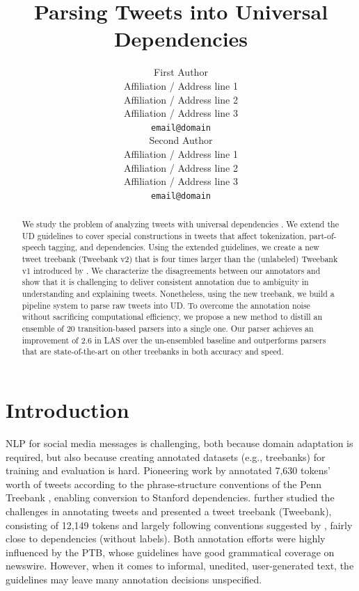 \documentclass[11pt,a4paper]{article}
\title{Parsing Tweets into Universal Dependencies}
\author{First Author \\
  Affiliation / Address line 1 \\
  Affiliation / Address line 2 \\
  Affiliation / Address line 3 \\
  {\tt email@domain} \\\And
  Second Author \\
  Affiliation / Address line 1 \\
  Affiliation / Address line 2 \\
  Affiliation / Address line 3 \\
  {\tt email@domain} \\}
\date{}
\begin{document}
\maketitle
\begin{abstract}
We study the problem of analyzing tweets with
universal dependencies \citep[UD;][]{NIVRE16.348}. We extend the UD guidelines to cover
special constructions in tweets that affect tokenization,
part-of-speech tagging, and dependencies. Using the extended guidelines, we create
a new tweet treebank ({\sc Tweebank v2}) that is four times larger than the (unlabeled) {\sc Tweebank
  v1} introduced by \citet{kong-EtAl:2014:EMNLP2014}. 
We characterize the disagreements between our annotators
and show that it is challenging to deliver
consistent annotation due to ambiguity in
understanding and explaining tweets. Nonetheless, using the new treebank,
we build a pipeline system to parse raw tweets into UD. To overcome the
annotation noise without sacrificing computational efficiency, we propose a new
method to distill an ensemble of 20 transition-based parsers into a single one. Our
parser achieves an improvement of 2.6 in LAS over the un-ensembled baseline 
and outperforms parsers that are state-of-the-art on other treebanks in both accuracy and speed.
\end{abstract}

\section{Introduction}
NLP for social media messages is challenging, both because domain
adaptation is required, but also because creating annotated datasets
(e.g., treebanks)
for training and evaluation is hard. 
Pioneering work by \citet{AAAIW113912} 
annotated 7,630 tokens' worth of tweets according to the
phrase-structure conventions of the Penn Treebank
\citep[PTB;][]{Marcus93buildinga}, enabling conversion to Stanford dependencies.
\citet{kong-EtAl:2014:EMNLP2014} further studied the challenges in
annotating tweets and presented a tweet treebank ({\sc Tweebank}),
consisting of 12,149 tokens and largely following conventions
suggested by \citet{schneider-EtAl:2013:LAW7-ID}, fairly close to 
\citet{Yamada03statisticaldependency} dependencies (without labels). 
Both annotation efforts were highly influenced by the PTB, whose guidelines
have good grammatical coverage on newswire. However, when it comes
to informal, unedited, user-generated text, the guidelines may leave
many annotation decisions unspecified.
\end{document}
